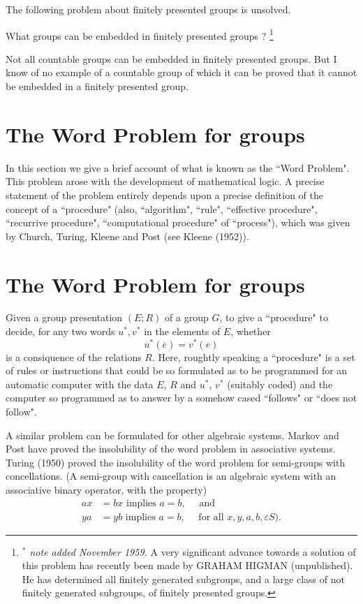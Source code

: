 The following problem about finitely presented groups is unsolved.
\begin{problem}
  What groups can be embedded in finitely presented groups
  ? \footnote{\textit{$^*$ note added November 1959.} A very
    significant advance towards a solution of this problem has
    recently been made by GRAHAM HIGMAN (unpublished). He has
    determined all finitely generated subgroups, and a large class of
    not finitely generated subgroups, of finitely presented groups.}  
\end{problem}
Not all countable groups can be embedded in finitely presented
groups. But I know of no example of a countable group of which it can
be proved that it cannot be embedded in a finitely presented group. 

\section{The Word Problem for groups}%

In this section we give a brief account of what is known as the ``Word
Problem". This problem arose with the development of mathematical
logic. A precise statement of the problem entirely depends upon a
precise definition of the concept of a ``procedure" (also,
``algorithm", ``rule", ``effective procedure", ``recurrive procedure",
``computational procedure" of ``process"), which was given by Church,
Turing, Kleene and Post (see Kleene (1952)). 

\section*{The Word Problem for groups}

Given a group presentation $(E ; R)$ of a group $G$, to give a
``procedure" to decide, for any two words $u^*, v^*$ in the elements
of $E$, whether
$$
u^*(e) = v^*(e)
$$
is a consiquence of the relations $R$. Here, roughtly speaking a
``procedure" is a set of rules or instructions that could be so
formulated as to be programmed for an automatic computer with the data
$E$, $R$ and $u^*$, $v^*$ (suitably coded) and the computer so
programmed as to answer by a somehow cased ``follows" or ``does not
follow". 

A similar problem can be formulated for other algebraic
systems. Markov and Post have proved the insolubility of the word
problem in associative systems. Turing (1950) proved the insolubility
of the word problem for semi-groups with concellations. (A semi-group
with cancellation is an algebraic system with an associative binary
operator, with the property) 
\begin{align*}
  ax &= bx \text{ implies } a = b, \quad \text{ and }\\
  ya &= yb \text{ implies } a = b, \quad \text{ for all } x, y, a,
  b,\varepsilon S ). 
\end{align*}

